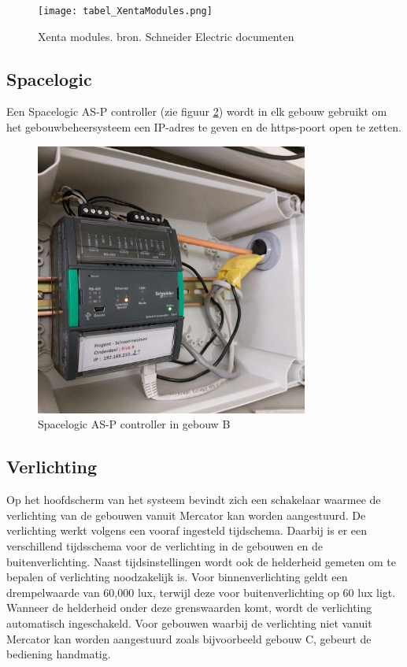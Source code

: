 \begin{figure}
  \centering
  \texttt{[image: tabel\_XentaModules.png]}
  \caption[Xenta modules. bron. Schneider Electric documenten]{\label{fig:xentamodules}Xenta modules. bron. Schneider Electric documenten}
\end{figure}

\subsection{Spacelogic}
Een Spacelogic AS-P controller (zie figuur \ref{fig:asp}) wordt in elk gebouw gebruikt om het gebouwbeheersysteem een IP-adres te geven en de https-poort open te zetten.

\begin{figure}
    \includegraphics[width=0.8\textwidth]{../graphics/AS-P.jpg}
    \caption[Spacelogic AS-P controller in gebouw B]{\label{fig:asp}Spacelogic AS-P controller in gebouw B}
\end{figure}

\subsection{Verlichting}
Op het hoofdscherm van het systeem bevindt zich een schakelaar waarmee de verlichting van de gebouwen vanuit Mercator kan worden aangestuurd. De verlichting werkt volgens een vooraf ingesteld tijdschema. Daarbij is er een verschillend tijdsschema voor de verlichting in de gebouwen en de buitenverlichting. \newline \newline
Naast tijdsinstellingen wordt ook de helderheid gemeten om te bepalen of verlichting noodzakelijk is. Voor binnenverlichting geldt een drempelwaarde van 60,000 lux, terwijl deze voor buitenverlichting op 60 lux ligt. Wanneer de helderheid onder deze grenswaarden komt, wordt de verlichting automatisch ingeschakeld. Voor gebouwen waarbij de verlichting niet vanuit Mercator kan worden aangestuurd zoals bijvoorbeeld gebouw C, gebeurt de bediening handmatig.


